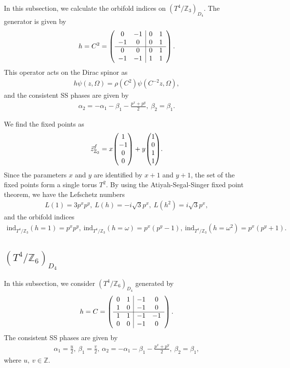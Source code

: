 \documentclass[11pt]{article}
\newcommand{\Lef}{Lefschetz }
\begin{document}
In this subsection, we calculate the orbifold indices on $(T^4/\mathbb{Z}_3)_{D_4}$. The generator is given by
\begin{align}
h=C^2=\left(\begin{array}{cc|cc}
0 & -1 & 0 & 1 \\ 
-1 & 0 & 0 & 1 \\ \cline{1-4}
0 & 0 &0 & 1 \\
-1 & -1 & 1&   1
\end{array}\right).
\end{align}
This operator acts on the Dirac spinor as
\begin{align}
    h\psi(z,\Omega)= \rho(C^2) \psi(C^{-2} z, \Omega),
\end{align}
and the consistent SS phases are given by
\begin{align}
    \alpha_2= -\alpha_1-\beta_1-\frac{p^x+p^y}{2},~\beta_2=\beta_1.
\end{align}

We find the fixed points as
\begin{align}
    \vec{z}_{\mathbb{Z}_3}^f= x\mqty(1 \\ -1 \\ 0 \\ 0 )+y \mqty( 1 \\ 0 \\ 1 \\ 1 ). \label{eq:Coxeter_Z3_fixed_point}
\end{align}
Since the parameters $x$ and $y$ are identified by $x+1$ and $y+1$, the set of the fixed points form a single torus $T^2$. By using the Atiyah-Segal-Singer fixed point theorem, we have the \Lef numbers
\begin{align}
    L(1)=3p^x p^y ,~
    L(h)=-i\sqrt{3}p^x ,~
    L(h^2)=i\sqrt{3}p^x,
\end{align}
and the orbifold indices
\begin{align}
    \text{ind}_{T^4/\mathbb{Z}_3} (h=1)= p^xp^y,~
    \text{ind}_{T^4/\mathbb{Z}_3} (h=\omega)= p^x (p^y-1),~
    \text{ind}_{T^4/\mathbb{Z}_3} (h=\omega^2)= p^x( p^y+1).
\end{align}


\subsection{$(T^4/\mathbb{Z}_6)_{D_4}$}

In this subsection, we consider $(T^4/\mathbb{Z}_6)_{D_4}$ generated by
\begin{align}
    h=C=\left(\begin{array}{cc|cc}
        0 & 1 & -1 & 0 \\ 
        1 & 0 & -1 & 0 \\ \cline{1-4}
        1 & 1 & -1 & -1 \\
        0 & 0 & -1& 0  
        \end{array}\right).
\end{align}
The consistent SS phases are given by
\begin{align}
\alpha_1= \frac{u}{2},~\beta_1=\frac{v}{2},~
    \alpha_2= -\alpha_1-\beta_1-\frac{p^x+p^y}{2},~\beta_2=\beta_1,
\end{align}
where $u,~v\in \mathbb{Z}$.
\end{document}
